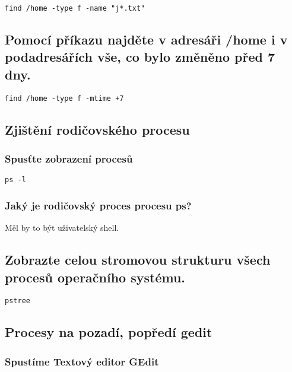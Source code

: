 \documentclass{article}
\begin{document}
\begin{lstlisting}
find /home -type f -name "j*.txt"
\end{lstlisting}

\subsection{Pomocí příkazu najděte v adresáři /home i v podadresářích vše, co bylo změněno před 7 dny.}

\begin{lstlisting}
find /home -type f -mtime +7
\end{lstlisting}

\subsection{Zjištění rodičovského procesu}

\subsubsection{Spusťte zobrazení procesů}

\begin{lstlisting}
ps -l
\end{lstlisting}

\subsubsection{Jaký je rodičovský proces procesu ps?}

Měl by to být uživatelský shell.

\subsection{Zobrazte celou stromovou strukturu všech procesů operačního systému.}

\begin{lstlisting}
pstree
\end{lstlisting}

\subsection{Procesy na pozadí, popředí gedit}

\subsubsection{Spustíme Textový editor GEdit}
\end{document}
